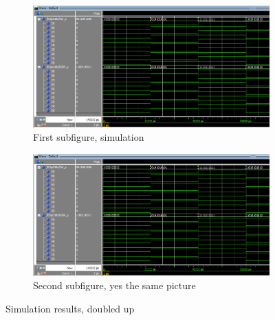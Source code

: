 \documentclass{article}
\begin{document}
\begin{figure}[h]
    \centering
    \begin{subfigure}{1\textwidth} %
        \centering
        \includegraphics[width=1\textwidth]{Figures/Example_sim.png}
        \caption{First subfigure, simulation}
        \label{fig:sim_a}
    \end{subfigure}
    \begin{subfigure}{1\textwidth}
        \centering
        \includegraphics[width=1\textwidth]{Figures/Example_sim.png}
        \caption{Second subfigure, yes the same picture}
        \label{fig:sim_b}
    \end{subfigure}
    \caption{Simulation results, doubled up}
    \label{fig:sim}
\end{figure}

\clearpage
\end{document}
